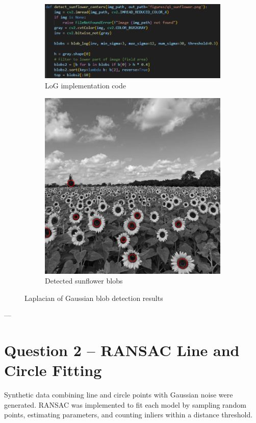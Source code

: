 \documentclass[11pt,a4paper]{article}
\begin{document}
\begin{figure}[H]\centering
\begin{subfigure}{0.45\textwidth}
\includegraphics[width=\linewidth]{images/q1_code.png}
\caption{LoG implementation code}
\end{subfigure}\hfill
\begin{subfigure}{0.45\textwidth}
\includegraphics[width=\linewidth]{figures/q1_sunflower.png}
\caption{Detected sunflower blobs}
\end{subfigure}
\caption{Laplacian of Gaussian blob detection results}
\end{figure}

---

\section*{Question 2 – RANSAC Line and Circle Fitting}
Synthetic data combining line and circle points with Gaussian noise were generated.  
RANSAC was implemented to fit each model by sampling random points, estimating parameters, and counting inliers within a distance threshold.
\end{document}
